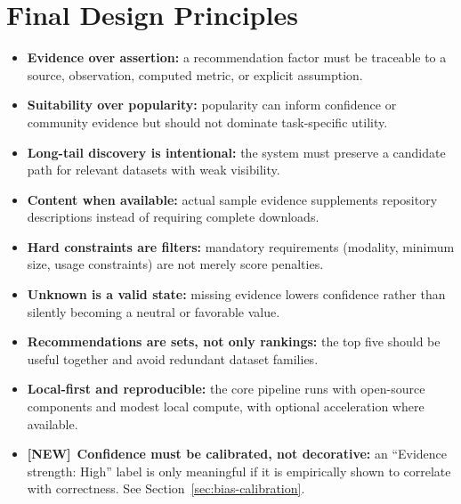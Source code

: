 \documentclass[11pt]{article}
\newcommand{\newtag}{\textcolor{accent}{\textbf{[NEW]}}\ }
\begin{document}
\section{Final Design Principles}
\begin{itemize}[leftmargin=*]
\item \textbf{Evidence over assertion:} a recommendation factor must be traceable to a source,
      observation, computed metric, or explicit assumption.
\item \textbf{Suitability over popularity:} popularity can inform confidence or community evidence but
      should not dominate task-specific utility.
\item \textbf{Long-tail discovery is intentional:} the system must preserve a candidate path for relevant
      datasets with weak visibility.
\item \textbf{Content when available:} actual sample evidence supplements repository descriptions instead
      of requiring complete downloads.
\item \textbf{Hard constraints are filters:} mandatory requirements (modality, minimum size, usage
      constraints) are not merely score penalties.
\item \textbf{Unknown is a valid state:} missing evidence lowers confidence rather than silently becoming
      a neutral or favorable value.
\item \textbf{Recommendations are sets, not only rankings:} the top five should be useful together and
      avoid redundant dataset families.
\item \textbf{Local-first and reproducible:} the core pipeline runs with open-source components and
      modest local compute, with optional acceleration where available.
\item \newtag \textbf{Confidence must be calibrated, not decorative:} an ``Evidence strength: High'' label
      is only meaningful if it is empirically shown to correlate with correctness. See
      Section~\ref{sec:bias-calibration}.
\end{itemize}

\end{document}
